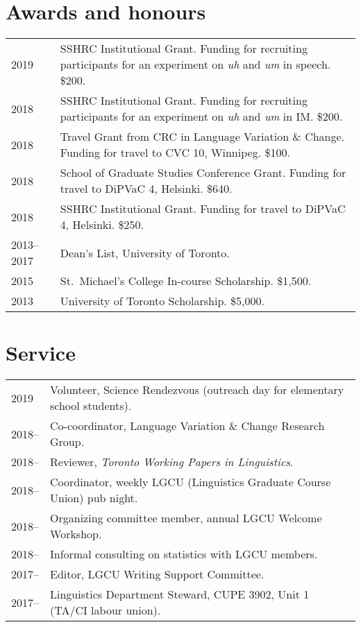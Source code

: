 \documentclass[letterpaper]{article}
\begin{document}
\section*{Awards and honours}
\begin{tabular}{p{}p{}}
    2019 & SSHRC Institutional Grant. Funding for recruiting participants for an
    experiment on \emph{uh} and \emph{um} in speech. \$200. \\
    2018 & SSHRC Institutional Grant. Funding for recruiting participants for an
    experiment on \emph{uh} and \emph{um} in IM. \$200. \\
    2018 & Travel Grant from CRC in Language Variation \& Change.  Funding for
    travel to CVC 10, Winnipeg. \$100. \\
    2018 & School of Graduate Studies Conference Grant. Funding for travel to
    DiPVaC 4, Helsinki. \$640. \\
    2018 & SSHRC Institutional Grant. Funding for travel to DiPVaC 4, Helsinki.
    \$250. \\
    2013--2017 & Dean's List, University of Toronto. \\
    2015 & St.\ Michael's College In-course Scholarship. \$1,500. \\
    2013 & University of Toronto Scholarship. \$5,000. \\
\end{tabular}

\section*{Service}
\begin{tabular}{p{}p{}}
    2019   & Volunteer, Science Rendezvous (outreach day for elementary school
    students). \\
    2018-- & Co-coordinator, Language Variation \& Change Research Group. \\
    2018-- & Reviewer, \textit{Toronto Working Papers in Linguistics}. \\
    2018-- & Coordinator, weekly LGCU (Linguistics Graduate Course Union) pub
    night. \\
    2018-- & Organizing committee member, annual LGCU Welcome Workshop. \\
    2018-- & Informal consulting on statistics with LGCU members. \\
    2017-- & Editor, LGCU Writing Support Committee. \\
    2017-- & Linguistics Department Steward, CUPE 3902, Unit 1 (TA/CI labour
    union). \\
\end{tabular}
\end{document}
